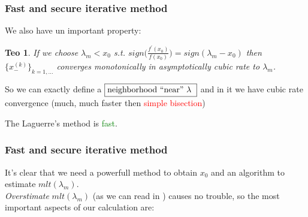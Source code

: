 \documentclass{beamer}
\theoremstyle{definition} \newtheorem{de}{Def}
\theoremstyle{remark} \newtheorem{os}[de]{Remark}
\theoremstyle{plain} \newtheorem{te}[de]{Teo}
\theoremstyle{plain} \newtheorem{co}[de]{Cor}
\theoremstyle{plain} \newtheorem{pr}[de]{Prop}
\theoremstyle{plain} \newtheorem{lem}[de]{Lemm}
\theoremstyle{remark} \newtheorem{rem}[de]{Remark}
\begin{document}

\begin{frame}
\frametitle{Fast and secure iterative method}

We also have un important property:

\begin{te}
  If we choose $\lambda_m < x_0$ s.t. 
$sign \Big( \frac{f^{'}(x_0)}{f(x_0)} \Big) = sign(\lambda_m - x_0)$ then 
$\{ x_{-}^{(k)} \}_{k=1,\dots}$ converges monotonically in asymptotically 
cubic rate to $\lambda_m$. 
\end{te}

\pause

So we can exactly define a $\fbox{neighborhood ``near'' $\lambda$ }$ and in it we
have cubic rate convergence (much, much faster then \textcolor{red}{simple bisection}) 

\pause


\pause

The Laguerre's method is \textcolor{green}{fast}.

\end{frame}


\begin{frame}
\frametitle{Fast and secure iterative method}

It's clear that we need a powerfull method to obtain $x_{0}$ and an algorithm to 
estimate $mlt(\lambda_m)$. \\
\emph{Overstimate} $mlt(\lambda_m)$ (as we can read in \cite{secondary}) causes no trouble, so the most important aspects of our calculation are: 


\end{frame}
\end{document}
